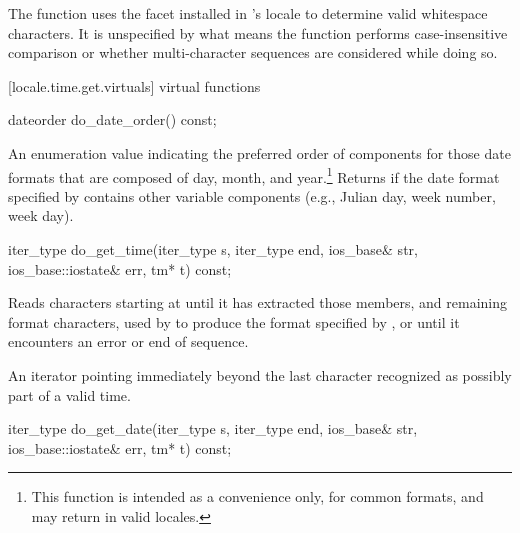 \begin{itemdescr}
\pnum
\begin{note} The function uses the 
facet installed in 's locale
to determine valid whitespace characters. It is unspecified by what
means the function performs case-insensitive comparison or whether
multi-character sequences are considered while doing so. \end{note}

\pnum
\returns {}
\end{itemdescr}

[locale.time.get.virtuals]{ virtual functions}

%
%
\begin{itemdecl}
dateorder do_date_order() const;
\end{itemdecl}

\begin{itemdescr}
\pnum
\returns
An enumeration value indicating the preferred order of components for
those date formats that are composed of day, month, and year.\footnote{This
function is intended as a convenience only, for common
formats, and may return
in valid locales.}
Returns
if the date format specified by
contains other variable components (e.g., Julian day, week number, week day).
\end{itemdescr}

%
%
\begin{itemdecl}
iter_type do_get_time(iter_type s, iter_type end, ios_base& str,
                      ios_base::iostate& err, tm* t) const;
\end{itemdecl}

\begin{itemdescr}
\pnum
\effects
Reads characters starting at 
until it has extracted those
members, and remaining format characters, used by
to produce the format specified by
,
or until it encounters an error or end of sequence.

\pnum
\returns
An iterator pointing immediately beyond the last character recognized
as possibly part of a valid time.
\end{itemdescr}

%
%
\begin{itemdecl}
iter_type do_get_date(iter_type s, iter_type end, ios_base& str,
                      ios_base::iostate& err, tm* t) const;
\end{itemdecl}

